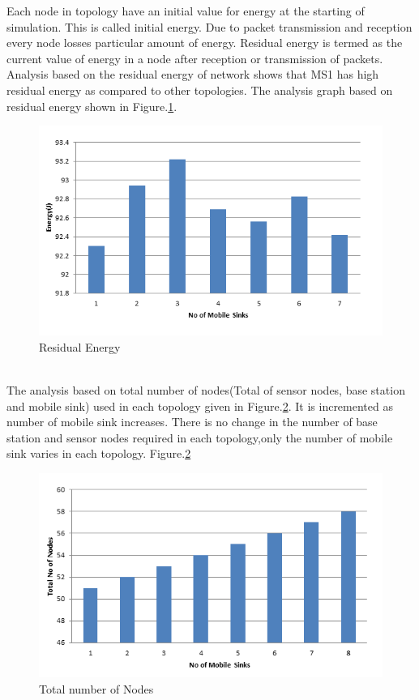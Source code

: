 \documentclass[MTech]{iitmdiss}
\begin{document}
Each node in topology have an initial value for energy at the starting of simulation. This is called initial energy. Due to packet transmission and reception every node losses particular amount of energy. Residual energy is termed as the current value of energy in a node after reception or transmission of packets. Analysis based on the residual energy of network shows that MS1 has high residual energy as compared to other topologies. The analysis graph based on residual energy shown in Figure.\ref{a2}.
\begin{figure}
\center
\includegraphics[scale=0.75]{ResidualEnergy.PNG}
\caption{Residual Energy}
\label{a2}
\end{figure}\\

The analysis based on total number of nodes(Total of sensor nodes, base station and mobile sink) used in each topology given in Figure.\ref{a3}. It is incremented as number of mobile sink increases. There is no change in the number of base station and sensor nodes required in each topology,only the number of mobile sink varies in each topology.
Figure.\ref{a3}
\begin{figure}
\center
\includegraphics[scale=0.75]{totalnodes.PNG}
\caption{Total number of Nodes}
\label{a3}
\end{figure}\\
\end{document}
